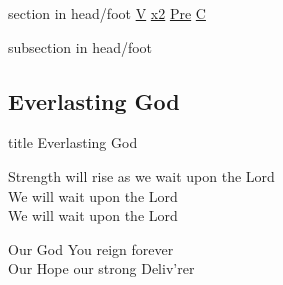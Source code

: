 \documentclass{beamer}
\begin{document}
{
{ 
 {
 \begin{beamercolorbox}[ht=4.5ex,dp=1.5ex,%
      leftskip=.3cm,rightskip=.3cm plus1fil]{section in head/foot}
 \fontsize{12}{25}\selectfont 
\hyperlink{Everlasting God['Strength will rise']V}{V}
\hyperlink{Everlasting God['Strength will rise']x2}{x2}
\hyperlink{Everlasting God['Strength will rise']Pre}{Pre}
\hyperlink{Everlasting God['Strength will rise']C}{C}
 
 \end{beamercolorbox}%
  \begin{beamercolorbox}[ht=2.5ex,dp=1.125ex,%
   leftskip=.3cm,rightskip=.3cm plus1fil]{subsection in head/foot}
   \insertauthor
 \end{beamercolorbox}%
 }
}
\subsection{ Everlasting God }

\hypertarget{Everlasting God['Strength will rise']}{}
\begin{frame}{}
 \vfill
  \centering
  \begin{beamercolorbox}[sep=8pt,center,shadow=true,rounded=true]{title}
    Everlasting God     
  \end{beamercolorbox}
  \vfill
\end{frame}

\hypertarget{Everlasting God['Strength will rise']V}{}
\begin{frame}{}
\fontsize{ 18 }{ 23 }\selectfont

Strength will rise as we wait upon the Lord\\ 
We will wait upon the Lord\\ 
We will wait upon the Lord 

\end{frame}

\hypertarget{Everlasting God['Strength will rise']x2}{}
\begin{frame}{}
\fontsize{ 18 }{ 23 }\selectfont

 

\end{frame}

\hypertarget{Everlasting God['Strength will rise']Pre}{}
\begin{frame}{}
\fontsize{ 18 }{ 23 }\selectfont

Our God You reign forever\\ 
Our Hope our strong Deliv'rer 


\end{frame}}
\end{document}
